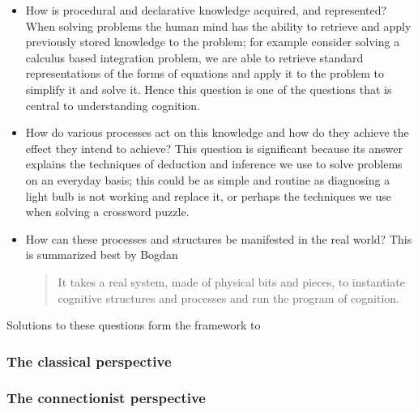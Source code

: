 \begin{itemize}
\item How is procedural and declarative knowledge acquired, and
represented? When solving problems the human mind has the ability to
retrieve and apply previously stored knowledge to the problem; for
example consider solving a calculus based integration problem, we are
able to retrieve standard representations of the forms of equations
and apply it to the problem to simplify it and solve it. Hence this
question is one of the questions that is central to understanding
cognition.
\item How do various processes act on this knowledge and how do they
achieve the effect they intend to achieve? This question is
significant because its answer explains the techniques of deduction
and inference we use to solve
problems on an everyday basis; this could be as simple and routine as diagnosing a
light bulb is not working and replace it, or perhaps the techniques we
use when solving a crossword puzzle.
\item How can these processes and structures be manifested in the real
world? This is summarized best by Bogdan\cite{Bogdan:1993aa}
\begin{quote}
It takes a real system, made of physical bits and pieces, to 
instantiate cognitive structures and processes and run the program of 
cognition.
\end{quote}
\end{itemize}

Solutions to these questions form the framework to 



\subsubsection{The classical perspective}

\subsubsection{The connectionist perspective}

